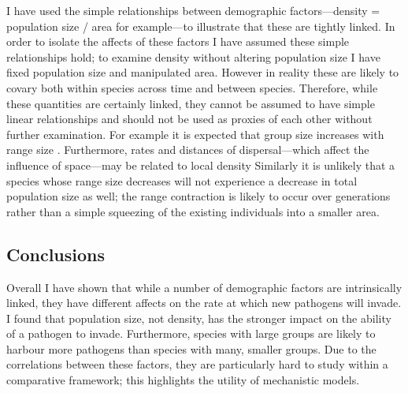 
I have used the simple relationships between demographic factors---density = population size / area for example---to illustrate that these are tightly linked.
In order to isolate the affects of these factors I have assumed these simple relationships hold; to examine density without altering population size I have fixed population size and manipulated area.
However in reality these are likely to covary both within species across time and between species.
Therefore, while these quantities are certainly linked, they cannot be assumed to have simple linear relationships and should not be used as proxies of each other without further examination.
For example it is expected that group size increases with range size \cite{}. %
Furthermore, rates and distances of dispersal---which affect the influence of space---may be related to local density \cite{marjamaki2013local}
Similarly it is unlikely that a species whose range size decreases will not experience a decrease in total population size as well; the range contraction is likely to occur over generations rather than a simple squeezing of the existing individuals into a smaller area.




\subsection{Conclusions}

Overall I have shown that while a number of demographic factors are intrinsically linked, they have different affects on the rate at which new pathogens will invade.
I found that population size, not density, has the stronger impact on the ability of a pathogen to invade.
Furthermore, species with large groups are likely to harbour more pathogens than species with many, smaller groups.
Due to the correlations between these factors, they are particularly hard to study within a comparative framework; this highlights the utility of mechanistic models.











